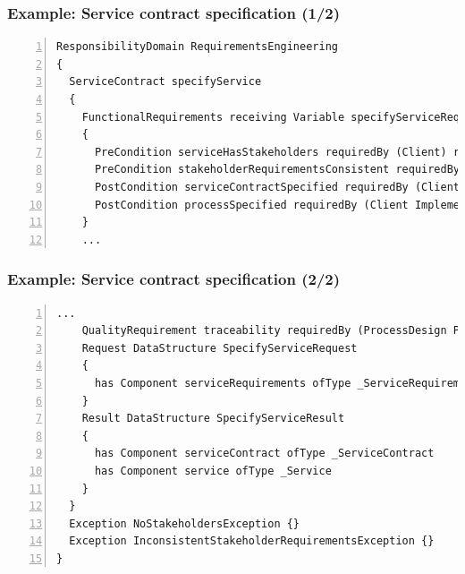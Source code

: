 
\begin{frame}[fragile]
\frametitle{Example: Service contract specification (1/2)}

\lstset{language=urdad,label=serviceTextSyntax}
\begin{lstlisting}[numbers=left,escapechar=|]
ResponsibilityDomain RequirementsEngineering
{
  ServiceContract specifyService
  {
    FunctionalRequirements receiving Variable specifyServiceRequest ofType SpecifyServiceRequest
    {
      PreCondition serviceHasStakeholders requiredBy (Client) raises NoStakeholdersException checks Constraint ServiceHasStakeholders
      PreCondition stakeholderRequirementsConsistent requiredBy (Client Implementation Testing) raises InconsistentStakeholderRequirementsException checks Constraint RequirementsConsistent
      PostCondition serviceContractSpecified requiredBy (Client Implementation Testing) ensures Constraint ServiceContractSpecified
      PostCondition processSpecified requiredBy (Client Implementation) ensures Constraint ProcessSpecified
    }
    ...
\end{lstlisting}
\end{frame}

\begin{frame}[fragile]
\frametitle{Example: Service contract specification (2/2)}
          
\lstset{language=urdad,label=serviceTextSyntax}
\begin{lstlisting}[numbers=left,escapechar=|]
    ...
    QualityRequirement traceability requiredBy (ProcessDesign ProjectManagement Development)
    Request DataStructure SpecifyServiceRequest
    {
      has Component serviceRequirements ofType _ServiceRequirements
    }
    Result DataStructure SpecifyServiceResult
    {
      has Component serviceContract ofType _ServiceContract
      has Component service ofType _Service
    }
  }
  Exception NoStakeholdersException {}
  Exception InconsistentStakeholderRequirementsException {}
}
\end{lstlisting}
\end{frame}


